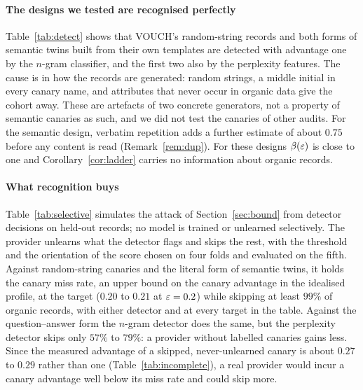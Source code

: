 \paragraph{The designs we tested are recognised perfectly} Table~\ref{tab:detect} shows that
VOUCH's random-string records and both forms of semantic twins built from their own
templates are detected with advantage one by the $n$-gram classifier, and the first two also
by the perplexity features. The cause is in how the records are generated: random strings, a
middle initial in every canary name, and attributes that never occur in organic data give the
cohort away. These are artefacts of two concrete generators, not a property of semantic
canaries as such, and we did not test the canaries of other audits. For the semantic design,
verbatim repetition adds a further estimate of about $0.75$ before any content is read
(Remark~\ref{rem:dup}). For these designs $\beta(\varepsilon)$ is close to one and
Corollary~\ref{cor:ladder} carries no information about organic records.

\paragraph{What recognition buys} Table~\ref{tab:selective} simulates the attack of
Section~\ref{sec:bound} from detector decisions on held-out records; no model is trained or
unlearned selectively. The provider unlearns what the detector flags and skips the rest, with
the threshold and the orientation of the score chosen on four folds and evaluated on the
fifth. Against random-string canaries and the literal form of semantic twins, it holds the
canary miss rate, an upper bound on the canary advantage in the idealised profile, at the
target ($0.20$ to $0.21$ at $\varepsilon=0.2$) while skipping at least $99\%$ of organic records,
with either detector and at every target in the table. Against the question--answer form
the $n$-gram detector does the same, but the perplexity detector skips only $57\%$ to $79\%$:
a provider without labelled canaries gains less. Since the measured advantage of a skipped,
never-unlearned canary is about $0.27$ to $0.29$ rather than one (Table~\ref{tab:incomplete}),
a real provider would incur a canary advantage well below its miss rate and could skip more.

